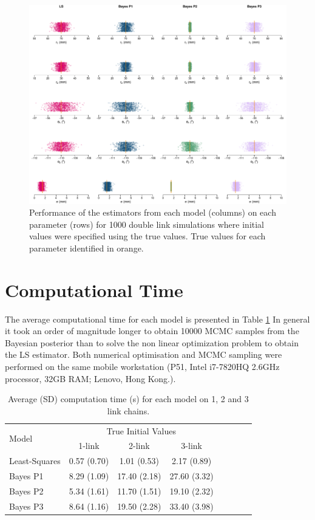 \documentclass{article}
\begin{document}
\begin{figure}
\centering
\includegraphics[width=\textwidth]{./Figures/DoubleLink_StripChart.pdf}
\caption{Performance of the estimators from each model (columns) on each parameter (rows) for 1000 double link simulations where initial values were specified using the true values.  True values for each parameter identified in orange.}
\label{fig:StripChart_DoubleLink_True}
\end{figure}

\section{Computational Time}
The average computational time for each model is presented in Table \ref{tab:Comptime_Truevals}  In general it took an order of magnitude longer to obtain 10000 MCMC samples from the Bayesian posterior than to solve the non linear optimization problem to obtain the LS estimator.  Both numerical optimisation and MCMC sampling were performed on the same mobile workstation (P51, Intel i7-7820HQ 2.6GHz processor, 32GB RAM; Lenovo, Hong Kong.).
\begin{table}
   \centering
   \begin{tabular}{l c c c c c c c}
       \hline
       \multirow{2}{*}{Model} & \multicolumn{3}{c}{True Initial Values} \\
      						& 1-link & 2-link & 3-link \\
  		\hline
  		Least-Squares & 0.57 (0.70) & 1.01 (0.53) & 2.17 (0.89)  \\
  		Bayes P1 & 8.29 (1.09) & 17.40 (2.18)& 27.60 (3.32)  \\
  		Bayes P2 & 5.34 (1.61) & 11.70 (1.51)& 19.10 (2.32) \\
  		Bayes P3 & 8.64 (1.16) & 19.50 (2.28) & 33.40 (3.98)\\
       \hline
   \end{tabular}
   \caption{Average (SD) computation time (\si{\second}) for each model on 1, 2 and 3 link chains.}
   \label{tab:Comptime_Truevals}
\end{table}
\end{document}
